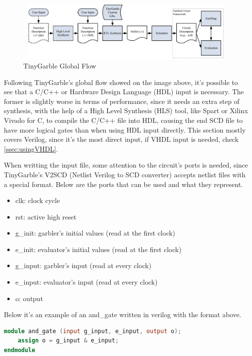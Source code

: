 \begin{refsection}
\begin{figure}[H]
	\centering
	\includegraphics[width=1\textwidth, height=3cm]{./sdf/secure_multiparty_computation/figures/tiny_garble_flow.png}
    \caption{TinyGarble Global Flow\cite{Songhori}}\label{fig:tinygarble_flow}
\end{figure}

Following TinyGarble's global flow showed on the image above, it's possible to see that a C/C++ or Hardware Design Language (HDL) input is necessary. The former is slightly worse in terms of performance, since it needs an extra step of synthesis, with the help of a High Level Synthesis (HLS) tool, like Spart or Xilinx Vivado for C, to compile the C/C++ file into HDL, causing the end SCD file to have more logical gates than when using HDL input directly. This section mostly covers Verilog, since it's the most direct input, if VHDL input is needed, check \ref{ssec:usingVHDL}.

When writting the input file, some attention to the circuit's ports is needed, since TinyGarble's V2SCD (Netlist Verilog to SCD converter) accepts netlist files with a special format. 
Below are the ports that can be used and what they represent.

\begin{itemize}  
\item clk: clock cycle
\item rst: active high reset
\item g\_init: garbler's initial values (read at the first clock)
\item e\_init: evaluator's initial values (read at the first clock)
\item g\_input: garbler's input (read at every clock)
\item e\_input: evaluator's input (read at every clock)
\item o: output
\end{itemize}

Below it's an example of an and\_gate written in verilog with the format above.

\begin{lstlisting}[caption={and\_gate.v}, language=Verilog, captionpos=b] 
module and_gate (input g_input, e_input, output o);
	assign o = g_input & e_input;
endmodule
\end{lstlisting}


\end{refsection}
